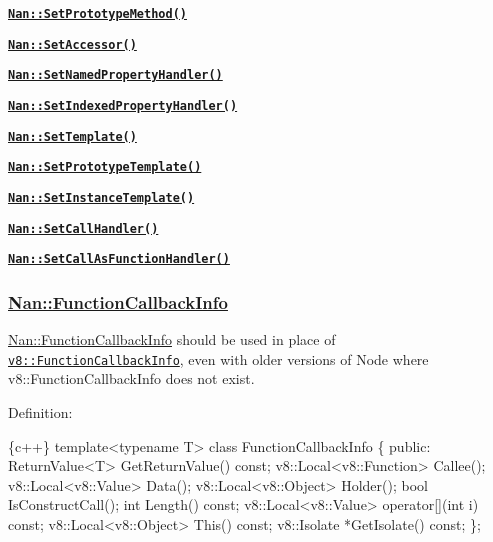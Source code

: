 \begin{DoxyItemize}
\begin{DoxyItemize}
\item \href{#api_nan_set_prototype_method}{\tt {\bfseries {\ttfamily Nan\+::\+Set\+Prototype\+Method()}}}
\item \href{#api_nan_set_accessor}{\tt {\bfseries {\ttfamily Nan\+::\+Set\+Accessor()}}}
\item \href{#api_nan_set_named_property_handler}{\tt {\bfseries {\ttfamily Nan\+::\+Set\+Named\+Property\+Handler()}}}
\item \href{#api_nan_set_indexed_property_handler}{\tt {\bfseries {\ttfamily Nan\+::\+Set\+Indexed\+Property\+Handler()}}}
\item \href{#api_nan_set_template}{\tt {\bfseries {\ttfamily Nan\+::\+Set\+Template()}}}
\item \href{#api_nan_set_prototype_template}{\tt {\bfseries {\ttfamily Nan\+::\+Set\+Prototype\+Template()}}}
\item \href{#api_nan_set_instance_template}{\tt {\bfseries {\ttfamily Nan\+::\+Set\+Instance\+Template()}}}
\item \href{#api_nan_set_call_handler}{\tt {\bfseries {\ttfamily Nan\+::\+Set\+Call\+Handler()}}}
\item \href{#api_nan_set_call_as_function_handler}{\tt {\bfseries {\ttfamily Nan\+::\+Set\+Call\+As\+Function\+Handler()}}}
\end{DoxyItemize}
\end{DoxyItemize}

\label{_api_nan_function_callback_info}%
 \subsubsection*{\hyperlink{class_nan_1_1_function_callback_info}{Nan\+::\+Function\+Callback\+Info}}

{\ttfamily \hyperlink{class_nan_1_1_function_callback_info}{Nan\+::\+Function\+Callback\+Info}} should be used in place of \href{https://v8docs.nodesource.com/io.js-3.0/dd/d0d/classv8_1_1_function_callback_info.html}{\tt {\ttfamily v8\+::\+Function\+Callback\+Info}}, even with older versions of Node where {\ttfamily v8\+::\+Function\+Callback\+Info} does not exist.

Definition\+:


\begin{DoxyCode}
\{c++\}
template<typename T> class FunctionCallbackInfo \{
 public:
  ReturnValue<T> GetReturnValue() const;
  v8::Local<v8::Function> Callee();
  v8::Local<v8::Value> Data();
  v8::Local<v8::Object> Holder();
  bool IsConstructCall();
  int Length() const;
  v8::Local<v8::Value> operator[](int i) const;
  v8::Local<v8::Object> This() const;
  v8::Isolate *GetIsolate() const;
\};
\end{DoxyCode}


